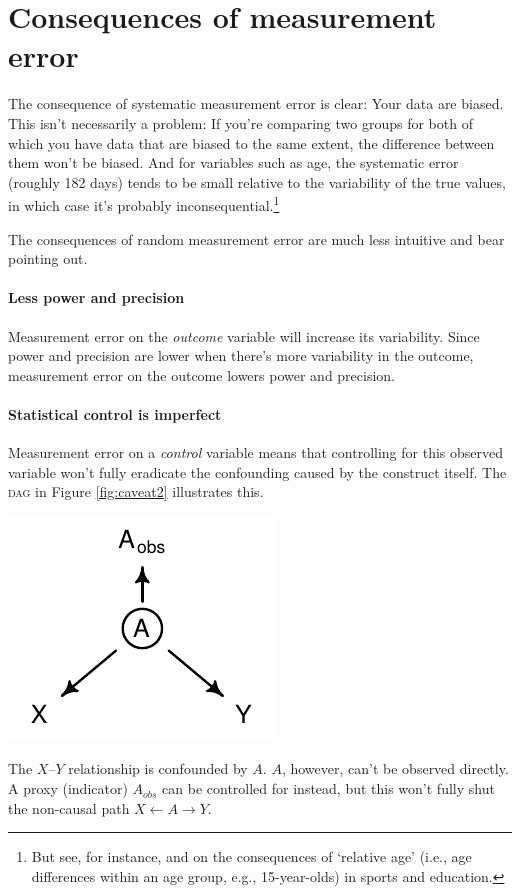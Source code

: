 \documentclass[a4paper]{tufte-book}\usepackage[]{graphicx}\usepackage[]{xcolor}
\begin{document}
\section{Consequences of measurement error}

The consequence of systematic measurement error is clear: Your data are biased.
This isn't necessarily a problem: If you're comparing two groups for both
of which you have data that are biased to the same extent, the difference between
them won't be biased. And for variables such as age, the systematic error (roughly
182 days) tends to be small relative to the variability of the true values, in 
which case it's probably inconsequential.\footnote{But see, for instance, 
\citet{Helsen2005} and \citet{Sprietsma2010} on the consequences of `relative age' (i.e., age 
differences within an age group, e.g., 15-year-olds) in sports and education.}

The consequences of random measurement error are much less intuitive and bear
pointing out.

\paragraph{Less power and precision}
Measurement error on the \emph{outcome} variable will increase
its variability. Since power and precision are lower when
there's more variability in the outcome, 
measurement error on the outcome lowers power and precision.

\paragraph{Statistical control is imperfect}
Measurement error on a \emph{control} variable means that 
controlling for this observed variable won't fully eradicate 
the confounding caused by the construct itself.
The \textsc{dag} in Figure \ref{fig:caveat2} illustrates this.

\begin{marginfigure}
  \centering
  \includegraphics{figure/caveat2}
  \caption{The $X$--$Y$ relationship is confounded by $A$. $A$, however,
  can't be observed directly. A proxy (indicator) $A_{obs}$ can be controlled for instead, but this won't fully shut the non-causal path $X \leftarrow A \rightarrow Y$.}
  \label{fig:caveat2}
\end{marginfigure}
\end{document}

